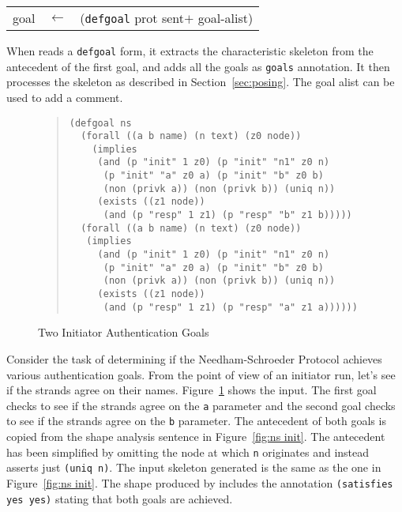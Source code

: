 \documentclass[12pt]{article}
\newcommand{\sym}[1]{\textup{\texttt{#1}}}
\begin{document}
\begin{center}\scshape
  \begin{tabular}{rcl}
  goal&$\leftarrow$&(\sym{defgoal} prot sent$+$ goal-alist)
  \end{tabular}
\end{center}

When {\cpsa} reads a \texttt{defgoal} form, it extracts the
characteristic skeleton from the antecedent of the first goal, and
adds all the goals as \texttt{goals} annotation.  It then processes
the skeleton as described in Section~\ref{sec:posing}.  The goal alist
can be used to add a comment.

\begin{figure}
\begin{quote}
\begin{verbatim}
(defgoal ns
  (forall ((a b name) (n text) (z0 node))
    (implies
     (and (p "init" 1 z0) (p "init" "n1" z0 n)
      (p "init" "a" z0 a) (p "init" "b" z0 b)
      (non (privk a)) (non (privk b)) (uniq n))
     (exists ((z1 node))
      (and (p "resp" 1 z1) (p "resp" "b" z1 b)))))
  (forall ((a b name) (n text) (z0 node))
   (implies
     (and (p "init" 1 z0) (p "init" "n1" z0 n)
      (p "init" "a" z0 a) (p "init" "b" z0 b)
      (non (privk a)) (non (privk b)) (uniq n))
     (exists ((z1 node))
      (and (p "resp" 1 z1) (p "resp" "a" z1 a))))))
\end{verbatim}
\end{quote}
\caption{Two Initiator Authentication Goals}\label{fig:ns init goals}
\end{figure}

Consider the task of determining if the Needham-Schroeder Protocol
achieves various authentication goals.  From the point of view of an
initiator run, let's see if the strands agree on their names.
Figure~\ref{fig:ns init goals} shows the input.  The first goal checks
to see if the strands agree on the \texttt{a} parameter and the second
goal checks to see if the strands agree on the \texttt{b} parameter.
The antecedent of both goals is copied from the shape analysis
sentence in Figure~\ref{fig:ns init}.  The antecedent has been
simplified by omitting the node at which \texttt{n} originates and
instead asserts just \texttt{(uniq n)}.  The input skeleton generated
is the same as the one in Figure~\ref{fig:ns init}.  The shape
produced by {\cpsa} includes the annotation \texttt{(satisfies yes
  yes)} stating that both goals are achieved.
\end{document}
